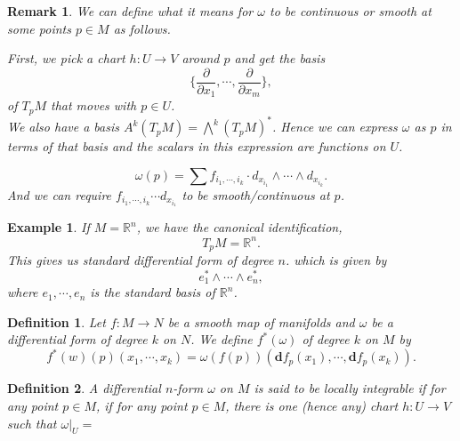 \documentclass{article}
\newtheorem{definition}{Definition}[section]
\newtheorem{remark}{Remark}[section]
\newtheorem{example}{Example}[section]
\numberwithin{equation}{section}
\begin{document}
\begin{remark}
We can define what it means for $\omega$ to be continuous or smooth at some points $p\in M$ as follows.\\
\par First, we pick a chart $h:U\to V$ around $p$ and get the basis
\begin{equation*}
\{{\frac {\partial} {\partial x_1}},\cdots,{\frac {\partial} {\partial x_m}}\},
\end{equation*}
of $T_pM$ that moves with $p\in U$.\\
We also have a basis $A^k(T_pM)=\bigwedge^k(T_pM)^*$. Hence we can express $\omega$ as $p$ in terms of that basis and the scalars in this expression are functions on $U$.

\begin{equation*}
\omega(p) = \sum f_{i_1,\cdots,i_k}\cdot d_{x_{i_1}}\wedge\cdots\wedge d_{x_{i_k}}.
\end{equation*}
And we can require $ f_{i_1,\cdots,i_k}\cdots d_{x_{i_1}}$ to be smooth/continuous at $p$.
\end{remark}

\begin{example}
If $M=\mathbb{R}^n$, we have the canonical identification,
\begin{equation*}
T_pM = \mathbb{R}^n.
\end{equation*}
This gives us standard differential form of degree $n$. which is given by 
\begin{equation*}
e_1^*\wedge\cdots\wedge e^*_n,
\end{equation*}
where $e_1,\cdots,e_n$ is the standard basis of $\mathbb{R}^n$.
\end{example}

\begin{definition}
Let $f:M\to N$ be a smooth map of manifolds and $\omega$ be a differential form of degree $k$ on $N$. We define $f^*(\omega)$ of degree $k$ on $M$ by
\begin{equation*}
f^*(w)(p)(x_1,\cdots,x_k) = \omega(f(p))(\mathbf{d}f_p(x_1),\cdots,\mathbf{d}f_p(x_k)).
\end{equation*}
\end{definition}

\begin{definition}
A differential $n$-form $\omega$ on $M$ is said to be locally integrable if for any point $p\in M$, if for any point $p\in M$, there is one (hence any) chart $h:U\to V$ such that $\omega|_U=$
\end{definition}
\end{document}
